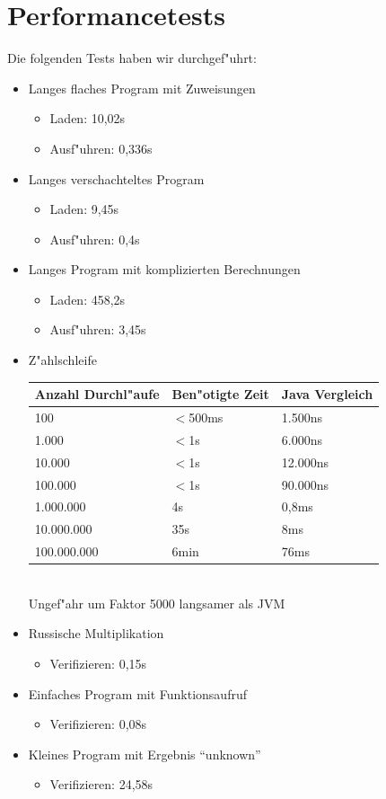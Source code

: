 \documentclass[10pt,a4paper,titlepage]{article}
\begin{document}
\section{Performancetests}
Die folgenden Tests haben wir durchgef"uhrt:
\begin{itemize}
\item Langes flaches Program mit Zuweisungen
\begin{itemize}
\item Laden: 10,02s
\item Ausf"uhren: 0,336s
\end{itemize}
\item Langes verschachteltes Program
\begin{itemize}
\item Laden: 9,45s
\item Ausf"uhren: 0,4s
\end{itemize}
\item Langes Program mit komplizierten Berechnungen
\begin{itemize}
\item Laden: 458,2s
\item Ausf"uhren: 3,45s
\end{itemize}
\item Z"ahlschleife \\[0.2cm]
\begin{tabular}{|p{3cm}|p{3cm}|p{3cm}|}
\hline
Anzahl Durchl"aufe&Ben"otigte Zeit&Java Vergleich \\\hline
100&$<$500ms&1.500ns\\\hline
1.000&$<$1s&6.000ns\\\hline
10.000&$<$1s&12.000ns\\\hline
100.000&$<$1s&90.000ns\\\hline
1.000.000&4s&0,8ms\\\hline
10.000.000&35s&8ms\\\hline
100.000.000&6min&76ms\\\hline
\end{tabular}
\\[0.2cm]
Ungef"ahr um Faktor 5000 langsamer als JVM
\item Russische Multiplikation
\begin{itemize}
\item Verifizieren: 0,15s
\end{itemize}
\item Einfaches Program mit Funktionsaufruf
\begin{itemize}
\item Verifizieren: 0,08s
\end{itemize}
\item Kleines Program mit Ergebnis "`unknown"'
\begin{itemize}
\item Verifizieren: 24,58s
\end{itemize}
\end{itemize}


\end{document}
